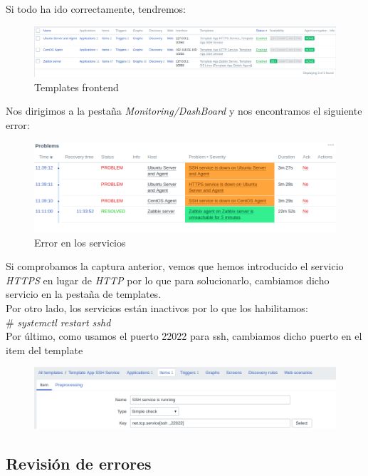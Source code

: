 Si todo ha ido correctamente, tendremos:
\begin{figure}[h]
	\centering
	\includegraphics[scale=0.26]{images/bieen.png}
	\caption{Templates frontend}
\end{figure}

Nos dirigimos a la pestaña \textit{Monitoring/DashBoard} y nos encontramos el siguiente error:

\begin{figure}[h]
	\centering
	\includegraphics[scale=0.45]{images/error.png}
		\caption{Error en los servicios}
\end{figure}

Si comprobamos la captura anterior, vemos que hemos introducido el servicio \textit{HTTPS} en lugar de \textit{HTTP} por lo que para solucionarlo, cambiamos dicho servicio en la pestaña de templates. \\
Por otro lado, los servicios están inactivos por lo que los habilitamos: \\
\# \textit{systemctl restart sshd} \\

Por último, como usamos el puerto 22022 para ssh, cambiamos dicho puerto en el item del template

\begin{figure}[h]
	\centering
	\includegraphics[scale=0.5]{images/a.png}
\end{figure}

\newpage
\subsection{Revisión de errores}


